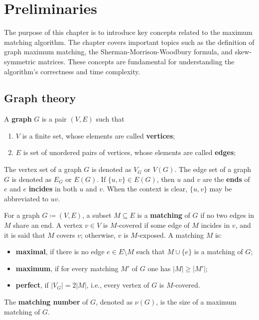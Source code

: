 \renewcommand*{\proofname}{Proof}

\chapter{Preliminaries}
\label{chap:preliminaries}

The purpose of this chapter is to introduce key concepts related to the maximum matching algorithm. 
The chapter covers important topics such as the definition of graph maximum matching, the Sherman-Morrison-Woodbury formula, and skew-symmetric matrices. 
These concepts are fundamental for understanding the algorithm's correctness and time complexity.

\enlargethispage{.5\baselineskip}

\section{Graph theory}
\label{sec:graph}

\begin{definition}[Graph]
\label{def:graph}
	A \textbf{graph} \(G\) is a pair \((V, E)\) such that
	\begin{enumerate}[label=(\roman*)]
		\item \(V\) is a finite set, whose elements are called \textbf{vertices};
		\item \(E\) is set of unordered pairs of vertices, whose elements are called \textbf{edges};
	\end{enumerate}
\end{definition}
\noindent
The vertex set of a graph \(G\) is denoted as \(V_G\) or \(V(G)\).
The edge set of a graph \(G\) is denoted as \(E_G\) or \(E(G)\).
If \(\{u,v\} \in E(G)\), then \(u\) and \(v\) are the \textbf{ends} of \(e\) and \(e\) \textbf{incides} in both \(u\) and \(v\).
When the context is clear, \(\{u, v\}\) may be abbreviated to \(uv\).

\begin{definition}[Matching]
\label{def:matching}
	For a graph \(G \coloneqq (V, E)\), a subset \(M \subseteq E\) is a \textbf{matching} of \(G\) if no two edges in \(M\) share an end.
	A vertex \(v \in V\) is \(M\)-covered if some edge of \(M\) incides in \(v\), 
	and it is said that \(M\) covers \(v\);
	otherwise, \(v\) is \(M\)-exposed.
	A matching \(M\) is:
	\begin{itemize}
		\item 
			\textbf{maximal}, if there is no edge \(e \in E \setminus M\) such that \(M \cup \{e\}\) is a matching of \(G\);
		\item
			\textbf{maximum}, if for every matching \(M'\) of \(G\) one has \(|M| \geq |M'|\);
		\item
			\textbf{perfect}, if \(|V_G| = 2|M|\), i.e., every vertex of \(G\) is \(M\)-covered.
	\end{itemize}
  The \textbf{matching number} of \(G\), denoted as \(\nu(G)\), is the size of a maximum matching of \(G\).
\end{definition}

